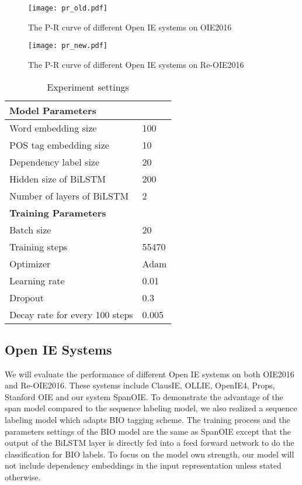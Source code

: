 \documentclass[letterpaper]{article} \usepackage{aaai20}  \usepackage{times}  \usepackage{helvet} \usepackage{courier}  \usepackage[hyphens]{url}  \urlstyle{rm} \def\UrlFont{\rm}  \usepackage{graphicx}  \frenchspacing  \setlength{\pdfpagewidth}{8.5in}  \setlength{\pdfpageheight}{11in}
\begin{document}
\begin{figure*}[h]
\begin{minipage}[t]{0.48\linewidth}
\begin{center}
\texttt{[image: pr\_old.pdf]}
\end{center}
\caption{The P-R curve of different Open IE systems on OIE2016}
\label{results_old}
\end{minipage}\hfill
\begin{minipage}[t]{0.48\linewidth}
\begin{center}
\texttt{[image: pr\_new.pdf]}
\end{center}
\caption{The P-R curve of different Open IE systems on Re-OIE2016}
\label{results_new}
\end{minipage}
\end{figure*}

\begin{table}[t!]
\begin{center}
\begin{tabular}{|l|l|}
\hline 
\textbf{Model Parameters} & \\
\hline 
Word embedding size & 100 \\ 
POS tag embedding size & 10\\
Dependency label size & 20 \\
Hidden size of BiLSTM & 200 \\
Number of layers of BiLSTM & 2 \\
\hline 
\textbf{Training Parameters} & \\
\hline 
Batch size & 20\\
Training steps & 55470\\
Optimizer & Adam \\
Learning rate & 0.01 \\
Dropout & 0.3 \\
Decay rate for every 100 steps & 0.005 \\
\hline
\end{tabular}
\end{center}
\caption{Experiment settings}
\label{parameters}
\end{table}

\subsection{Open IE Systems}
We will evaluate the performance of different Open IE systems on both OIE2016 and Re-OIE2016. These systems include ClausIE, OLLIE, OpenIE4, Props, Stanford OIE and our system SpanOIE. To demonstrate the advantage of the span model compared to the sequence labeling model, we also realized a sequence labeling model which adapts BIO tagging scheme. The training process and the parameters settings of the BIO model are the same as SpanOIE  except that the output of the BiLSTM layer is directly fed into a feed forward network to do the classification for BIO labels. To focus on the model own strength, our model will not include dependency embeddings in the input representation unless stated otherwise. 
\end{document}
